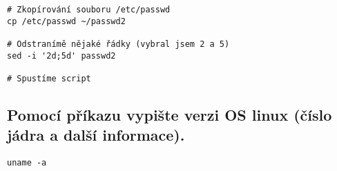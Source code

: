 \documentclass{article}
\begin{document}
\begin{lstlisting}
# Zkopírování souboru /etc/passwd
cp /etc/passwd ~/passwd2

# Odstranímě nějaké řádky (vybral jsem 2 a 5)
sed -i '2d;5d' passwd2

# Spustíme script
\end{lstlisting}


\subsection{Pomocí příkazu vypište verzi OS linux (číslo jádra a další informace).}

\begin{lstlisting}
uname -a
\end{lstlisting}
\end{document}
